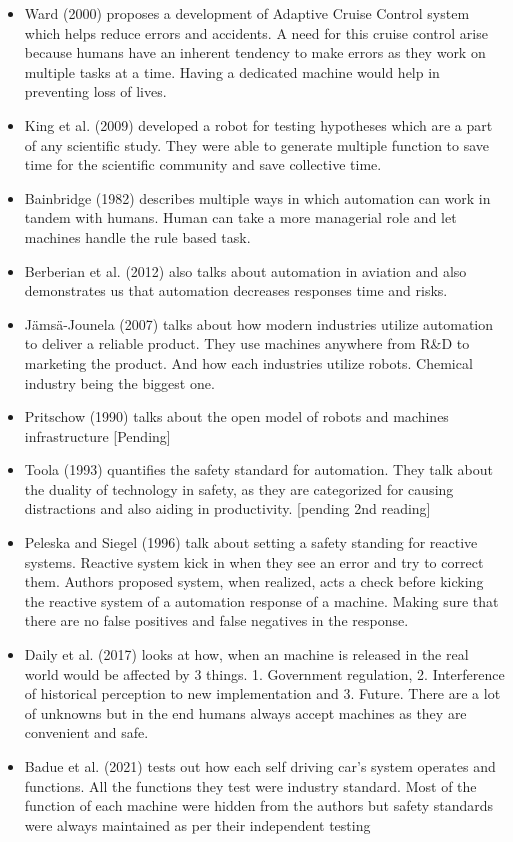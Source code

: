 \documentclass[
  english,
  man]{apa7}
\begin{document}
\begin{itemize}
\item
  Ward (2000) proposes a development of Adaptive Cruise Control system which helps reduce errors and accidents. A need for this cruise control arise because humans have an inherent tendency to make errors as they work on multiple tasks at a time. Having a dedicated machine would help in preventing loss of lives.
\item
  King et al. (2009) developed a robot for testing hypotheses which are a part of any scientific study. They were able to generate multiple function to save time for the scientific community and save collective time.
\item
  Bainbridge (1982) describes multiple ways in which automation can work in tandem with humans. Human can take a more managerial role and let machines handle the rule based task.
\item
  Berberian et al. (2012) also talks about automation in aviation and also demonstrates us that automation decreases responses time and risks.
\item
  Jämsä-Jounela (2007) talks about how modern industries utilize automation to deliver a reliable product. They use machines anywhere from R\&D to marketing the product. And how each industries utilize robots. Chemical industry being the biggest one.
\item
  Pritschow (1990) talks about the open model of robots and machines infrastructure {[}Pending{]}
\item
  Toola (1993) quantifies the safety standard for automation. They talk about the duality of technology in safety, as they are categorized for causing distractions and also aiding in productivity. {[}pending 2nd reading{]}
\item
  Peleska and Siegel (1996) talk about setting a safety standing for reactive systems. Reactive system kick in when they see an error and try to correct them. Authors proposed system, when realized, acts a check before kicking the reactive system of a automation response of a machine. Making sure that there are no false positives and false negatives in the response.
\item
  Daily et al. (2017) looks at how, when an machine is released in the real world would be affected by 3 things. 1. Government regulation, 2. Interference of historical perception to new implementation and 3. Future. There are a lot of unknowns but in the end humans always accept machines as they are convenient and safe.
\item
  Badue et al. (2021) tests out how each self driving car's system operates and functions. All the functions they test were industry standard. Most of the function of each machine were hidden from the authors but safety standards were always maintained as per their independent testing

\end{itemize}
\end{document}
